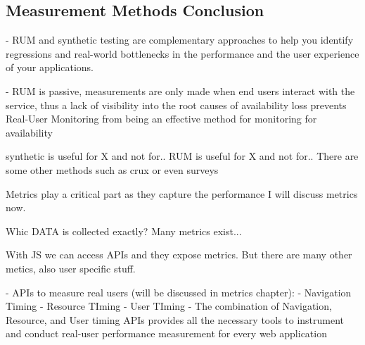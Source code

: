 



\subsection{Measurement Methods Conclusion}




- RUM and synthetic testing are complementary approaches to help you identify regressions and real-world bottlenecks in the performance and the user experience of your applications.



- RUM is passive, measurements are only made when end users interact with the service, thus a lack of visibility into the root causes of availability loss prevents Real-User Monitoring from being an effective method for monitoring for availability

 


synthetic is useful for X and not for..
RUM is useful for X and not for..
There are some other methods such as crux or even surveys



Metrics play a critical part as they capture the performance
I will discuss metrics now.


Whic DATA is collected exactly?
Many metrics exist...






With JS we can access APIs and they expose metrics.
But there are many other metics, also user specific stuff.


- APIs to measure real users (will be discussed in metrics chapter):
- Navigation Timing
- Resource TIming
- User TIming
- The combination of Navigation, Resource, and User timing APIs provides all the necessary tools to instrument and conduct real-user performance measurement for every web application

